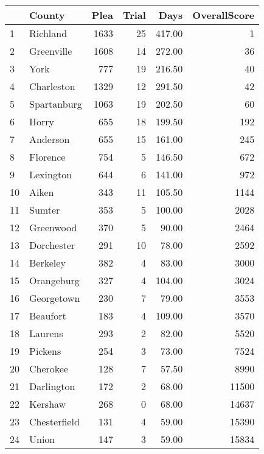 \begin{tabular}{llrrrr}
\toprule
{} &        County &  Plea &  Trial &   Days &  OverallScore \\
\midrule
1  &      Richland &  1633 &     25 & 417.00 &             1 \\
2  &    Greenville &  1608 &     14 & 272.00 &            36 \\
3  &          York &   777 &     19 & 216.50 &            40 \\
4  &    Charleston &  1329 &     12 & 291.50 &            42 \\
5  &   Spartanburg &  1063 &     19 & 202.50 &            60 \\
6  &         Horry &   655 &     18 & 199.50 &           192 \\
7  &      Anderson &   655 &     15 & 161.00 &           245 \\
8  &      Florence &   754 &      5 & 146.50 &           672 \\
9  &     Lexington &   644 &      6 & 141.00 &           972 \\
10 &         Aiken &   343 &     11 & 105.50 &          1144 \\
11 &        Sumter &   353 &      5 & 100.00 &          2028 \\
12 &     Greenwood &   370 &      5 &  90.00 &          2464 \\
13 &    Dorchester &   291 &     10 &  78.00 &          2592 \\
14 &      Berkeley &   382 &      4 &  83.00 &          3000 \\
15 &    Orangeburg &   327 &      4 & 104.00 &          3024 \\
16 &    Georgetown &   230 &      7 &  79.00 &          3553 \\
17 &      Beaufort &   183 &      4 & 109.00 &          3570 \\
18 &       Laurens &   293 &      2 &  82.00 &          5520 \\
19 &       Pickens &   254 &      3 &  73.00 &          7524 \\
20 &      Cherokee &   128 &      7 &  57.50 &          8990 \\
21 &    Darlington &   172 &      2 &  68.00 &         11500 \\
22 &       Kershaw &   268 &      0 &  68.00 &         14637 \\
23 &  Chesterfield &   131 &      4 &  59.00 &         15390 \\
24 &         Union &   147 &      3 &  59.00 &         15834 \\

\end{tabular}
